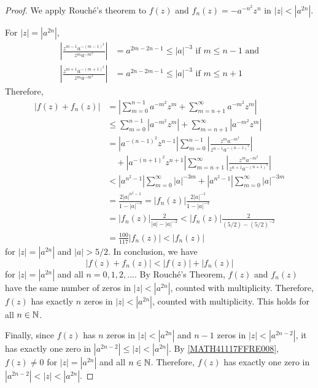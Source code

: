 \documentclass[11pt]{amsart}
\theoremstyle{remark}
\theoremstyle{definition}
\numberwithin{equation}{section}
\begin{document}
\begin{proof}
    We apply Rouch\'e's theorem to $f(z)$ and $f_n(z) = -a^{-n^2} z^n$ in $|z| < |a^{2n}|$.

    For $|z| = |a^{2n}|$,
    \[
        \begin{aligned}
            \left|\frac{z^{m-1} a^{-(m-1)^2}}{z^{m} a^{-m^2}}\right| & = a^{2m-2n-1}\le |a|^{-3} \text{ if } m\le n-1 \text{ and} \\
            \left|\frac{z^{m+1} a^{-(m+1)^2}}{z^{m} a^{-m^2}}\right| & = a^{2n-2m-1}\le |a|^{-3} \text{ if } m\le n+1
        \end{aligned}
    \]
    Therefore,
    \begin{equation}\label{MATH41117FFRE007}
        \begin{aligned}
            |f(z) + f_n(z)|
             & = \left|
            \sum_{m=0}^{n-1} a^{-m^2} z^m + \sum_{m=n+1}^\infty
            a^{-m^2} z^m
            \right|
            \\
             & \le \sum_{m=0}^{n-1} |a^{-m^2} z^m| + \sum_{m=n+1}^\infty
            |a^{-m^2} z^m|                                                                \\
             & = |a^{-(n-1)^2} z^{n-1}| \sum_{m=0}^{n-1}
            \left|\frac{z^m a^{-m^2}}{z^{n-1} a^{-(n-1)^2}}\right|
            \\
             & \quad + |a^{-(n+1)^2} z^{n+1}| \sum_{m=n+1}^{\infty}
            \left|\frac{z^m a^{-m^2}}{z^{n+1} a^{-(n+1)^2}}\right|                        \\
             & < |a^{n^2-1}| \sum_{m=0}^\infty |a|^{-3m}
            +  |a^{n^2-1}| \sum_{m=0}^\infty |a|^{-3m}                                    \\
             & = \frac{2|a|^{n^2-1}}{1-|a|^{-3}} = |f_n(z)|\frac{2|a|^{-1}}{1 - |a|^{-3}}
            \\
             & = |f_n(z)| \frac{2}{|a| - |a|^{-2}}
            < |f_n(z)| \frac{2}{(5/2) - (5/2)^{-2}}                                       \\
             & = \frac{100}{117} |f_n(z)| < |f_n(z)|
        \end{aligned}
    \end{equation}
    for $|z| = |a^{2n}|$ and $|a| > 5/2$. In conclusion, we have
    \begin{equation}\label{MATH41117FFRE008}
        |f(z) + f_n(z)| < |f(z)| + |f_n(z)|
    \end{equation}
    for $|z| = |a^{2n}|$ and all $n=0,1,2,...$. By Rouch\'e's Theorem, $f(z)$ and $f_n(z)$ have the same number of zeros in $|z| < |a^{2n}|$, counted with multiplicity. Therefore, $f(z)$ has exactly $n$ zeros in $|z| < |a^{2n}|$, counted with multiplicity. This holds for all $n\in {\mathbb N}$.

    Finally, since $f(z)$ has $n$ zeros in $|z| < |a^{2n}|$ and $n-1$ zeros in $|z| < |a^{2n-2}|$, it has exactly one zero in
    $|a^{2n-2}| \le |z| < |a^{2n}|$. By \eqref{MATH41117FFRE008}, $f(z)\ne 0$ for $|z| = |a^{2n}|$ and all $n\in {\mathbb N}$. Therefore, $f(z)$ has exactly one zero in $|a^{2n-2}| < |z| < |a^{2n}|$.
\end{proof}
\end{document}

